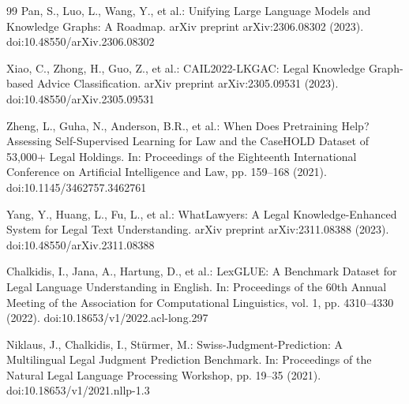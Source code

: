 \documentclass{article}
\theoremstyle{plain}
\theoremstyle{definition}
\begin{document}
\begin{thebibliography}{99}
Pan, S., Luo, L., Wang, Y., et al.: Unifying Large Language Models and Knowledge Graphs: A Roadmap. arXiv preprint arXiv:2306.08302 (2023). doi:10.48550/arXiv.2306.08302

Xiao, C., Zhong, H., Guo, Z., et al.: CAIL2022-LKGAC: Legal Knowledge Graph-based Advice Classification. arXiv preprint arXiv:2305.09531 (2023). doi:10.48550/arXiv.2305.09531

Zheng, L., Guha, N., Anderson, B.R., et al.: When Does Pretraining Help? Assessing Self-Supervised Learning for Law and the CaseHOLD Dataset of 53,000+ Legal Holdings. In: Proceedings of the Eighteenth International Conference on Artificial Intelligence and Law, pp. 159--168 (2021). doi:10.1145/3462757.3462761

Yang, Y., Huang, L., Fu, L., et al.: WhatLawyers: A Legal Knowledge-Enhanced System for Legal Text Understanding. arXiv preprint arXiv:2311.08388 (2023). doi:10.48550/arXiv.2311.08388

Chalkidis, I., Jana, A., Hartung, D., et al.: LexGLUE: A Benchmark Dataset for Legal Language Understanding in English. In: Proceedings of the 60th Annual Meeting of the Association for Computational Linguistics, vol. 1, pp. 4310--4330 (2022). doi:10.18653/v1/2022.acl-long.297

Niklaus, J., Chalkidis, I., Stürmer, M.: Swiss-Judgment-Prediction: A Multilingual Legal Judgment Prediction Benchmark. In: Proceedings of the Natural Legal Language Processing Workshop, pp. 19--35 (2021). doi:10.18653/v1/2021.nllp-1.3

\end{thebibliography}
\end{document}
